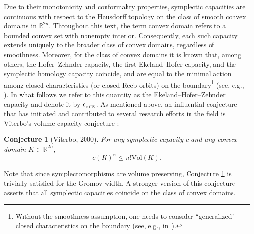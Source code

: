 \documentclass[10pt,a4paper]{article}
\newtheorem{conjecture}[theorem]{Conjecture}
\theoremstyle{definition}
\newcommand{\R}{{\mathbb{R}}}
\newcommand{\ehzcap}{c_{_{\rm EHZ}}}
\begin{document}
\medskip

Due to their monotonicity and conformality properties, symplectic capacities are continuous with respect to the Hausdorff topology on the class of smooth convex domains in \(\mathbb{R}^{2n}\). 
Throughout this text, the term convex domain refers to a bounded convex set with nonempty interior.
Consequently, each such capacity extends uniquely to the broader class of convex domains, regardless of smoothness. Moreover, 
for the class of convex domains 
it is known that, among others, the Hofer--Zehnder capacity, the first Ekeland--Hofer capacity, and the symplectic homology capacity 
coincide, and are equal to the minimal action among closed characteristics (or closed Reeb orbits) on the boundary\footnote{Without the smoothness assumption, one needs to consider ``generalized" closed characteristics on the boundary (see, e.g.,  in~\cite{AA-O}).
} (see, e.g., \cite{A-E-K, hofer-zehnder, hofer-ekeland, viterbo_cap, irie, abbondandolo-kang, Gu-Ha, ginzburg-shon, gutt-hutchings-ramos}). In what follows we refer to this quantity as the Ekeland--Hofer--Zehnder capacity and denote it by $\ehzcap$. As mentioned above, an influential conjecture that has initiated and contributed to several research efforts in the field is Viterbo's volume-capacity conjecture \cite{viterbo2000}:
 \begin{conjecture}[Viterbo, 2000]
\label{viterbo_conj}
For any symplectic capacity $c$ and any convex domain $K \subset \R^{2n}$,
$$ c(K)^n \leq n! \mathrm{Vol}(K).$$
\end{conjecture}
Note that since symplectomorphisms are volume preserving, 
Conjecture \ref{viterbo_conj} is trivially satisfied for the Gromov width.
A stronger version of this conjecture asserts that all symplectic capacities coincide on the class of convex domains. 
\end{document}
